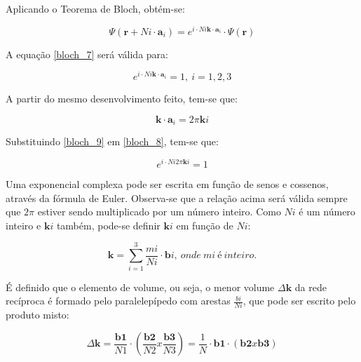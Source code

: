 		\par Aplicando o Teorema de Bloch, obtém-se:

		\begin{equation}
			\label{bloch_7}
			\Psi(\mathbf{r} + Ni \cdot \mathbf{a}_{i}) = e^{i\cdot N i \mathbf{k} \cdot \mathbf{a}_{i}} \cdot \Psi(\mathbf{r})
		\end{equation}

		\par A equação \eqref{bloch_7} será válida para:

		\begin{equation}
			\label{bloch_8}
			e^{i\cdot N i \mathbf{k} \cdot \mathbf{a}_{i}} = 1,\ i=1,2,3
		\end{equation}

		\par A partir do mesmo desenvolvimento feito, tem-se que:

		\begin{equation}
			\label{bloch_9}
			\mathbf{k} \cdot \mathbf{a}_{i} = 2 \pi \mathbf{k} i
		\end{equation}

		\par Substituindo \eqref{bloch_9} em \eqref{bloch_8}, tem-se que:

		\begin{equation}
			\label{bloch_10}
			e^{i\cdot N i 2 \pi \mathbf{k} i} = 1
		\end{equation}

		\par Uma exponencial complexa pode ser escrita em função de senos e cossenos, através da fórmula de Euler. Observa-se que a relação acima será válida sempre que $2\pi$ estiver sendo multiplicado por um número inteiro. Como $Ni$ é um número inteiro e $\mathbf{k}i$ também, pode-se definir $\mathbf{k}i$ em função de $Ni$:

		\begin{equation}
			\label{bloch_11}
			\mathbf{k} = \sum_{i=1}^3 \frac{mi}{Ni} \cdot \mathbf{b}i,\ onde\ mi\ é\ inteiro.
		\end{equation}

		\par É definido que o elemento de volume, ou seja, o menor volume $\Delta\mathbf{k}$ da rede recíproca é formado pelo paralelepípedo com arestas $\frac{bi}{Ni}$, que pode ser escrito pelo produto misto:

		\begin{equation}
			\label{bloch_12}
			\Delta \mathbf{k} = \frac{\mathbf{b1}}{N1} \cdot \left( \frac{\mathbf{b2}}{N2} x \frac{\mathbf{b3}}{N3} \right)
				= \frac{1}{N} \cdot \mathbf{b1} \cdot \left(\mathbf{b2} x \mathbf{b3}\right)
		\end{equation}

